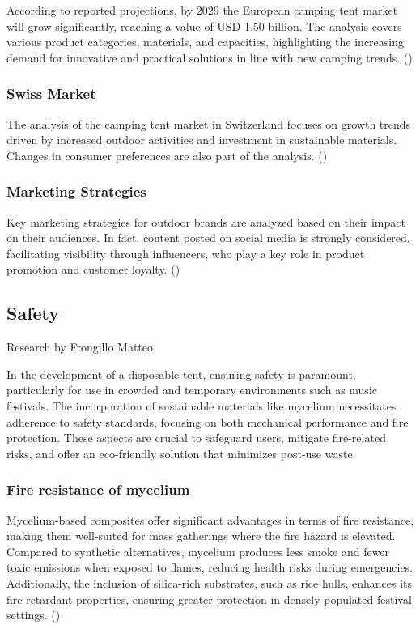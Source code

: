 \documentclass{article}
\begin{document}
According to reported projections, by 2029 the European camping tent market will grow
significantly, reaching a value of USD 1.50 billion. The analysis covers various product
categories, materials, and capacities, highlighting the increasing demand for innovative
and practical solutions in line with new camping trends. (\cite{arizton2024})

\subsubsection{Swiss Market}

The analysis of the camping tent market in Switzerland focuses on growth trends driven by
increased outdoor activities and investment in sustainable materials. Changes in consumer
preferences are also part of the analysis. (\cite{swiss2023})

\subsubsection{Marketing Strategies}

Key marketing strategies for outdoor brands are analyzed based on their impact on their
audiences. In fact, content posted on social media is strongly considered, facilitating
visibility through influencers, who play a key role in product promotion and customer
loyalty. (\cite{mitech2024})

\subsection{Safety}
{\small Research by Frongillo Matteo}

In the development of a disposable tent, ensuring safety is paramount, particularly for
use in crowded and temporary environments such as music festivals. The incorporation of
sustainable materials like mycelium necessitates adherence to safety standards, focusing
on both mechanical performance and fire protection. These aspects are crucial to safeguard
users, mitigate fire-related risks, and offer an eco-friendly solution that minimizes
post-use waste.

\subsubsection{Fire resistance of mycelium}

Mycelium-based composites offer significant advantages in terms of fire resistance, making
them well-suited for mass gatherings where the fire hazard is elevated. Compared to
synthetic alternatives, mycelium produces less smoke and fewer toxic emissions when
exposed to flames, reducing health risks during emergencies. Additionally, the inclusion
of silica-rich substrates, such as rice hulls, enhances its fire-retardant properties,
ensuring greater protection in densely populated festival settings. (\cite{fire})
\end{document}
